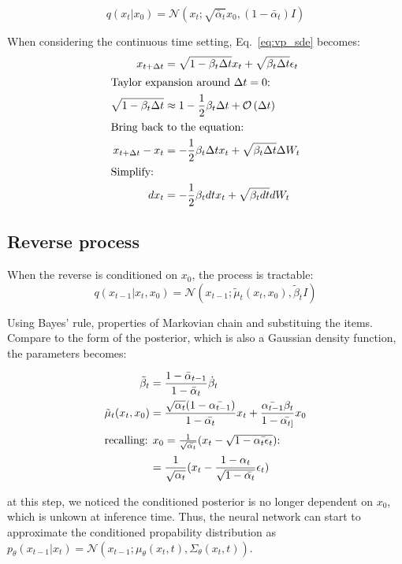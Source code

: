 \begin{equation}
    q(x_t | x_0) = \mathcal{N}(x_{t}; \sqrt{\bar{\alpha}_t} x_0, (1 - \bar{\alpha}_t) I)
\end{equation}

When considering the continuous time setting, Eq.~\ref{eq:vp_sde} becomes:
\begin{align}
        x_{t + \Delta t} &= \sqrt{1 - \beta_t \Delta t} x_t + \sqrt{\beta_t \Delta t} \epsilon_t \\
        \intertext{Taylor expansion around $\Delta t = 0$:}
        \sqrt{1 - \beta_t \Delta t} &\approx 1 - \frac{1}{2}\beta_t \Delta t + \mathcal{O}\left(\Delta t\right) \\
        \intertext{Bring back to the equation:}
        x_{t + \Delta t} - x_t &= - \frac{1}{2}\beta_t \Delta t x_t + \sqrt{\beta_t \Delta t} \Delta W_t \\
        \intertext{Simplify:}
        dx_{t} &= - \frac{1}{2}\beta_t dt x_t + \sqrt{\beta_t dt} dW_t
    \label{eq: vp-sde-continuous}
\end{align}

\subsection{Reverse process}

When the reverse is conditioned on $x_{0}$, the process is tractable:
\begin{equation}
    q(x_{t-1}| x_{t}, x_{0}) = \mathcal{N}(x_{t-1}; \tilde{\mu}_{t}(x_{t}, x_{0}), \tilde{\beta}_{t}I)
\end{equation}

Using Bayes' rule, properties of Markovian chain and substituing the items. Compare to the form of the posterior, which is also a Gaussian density function, the parameters becomes:

\begin{align}
	\tilde{\beta}_{t} &= \frac{1 - \bar{\alpha}_{t-1}}{1 - \bar{\alpha}_{t}}\dot \beta_{t} \\
	\tilde{\mu}_{t}(x_{t}, x_{0}) &= \frac{\sqrt{\alpha_{t}} (1-\bar{\alpha_{t-1}})}{1 - \bar{\alpha_{t}}}x_{t}  +
	\frac{\bar{\alpha_{t-1}}\beta_{t}}{1 - \bar{\alpha_{t]}}}x_{0}\\
	\intertext{recalling: $x_{0} = \frac{1}{\sqrt{\bar{\alpha_{t}}}}(x_{t} - \sqrt{1- \bar{\alpha_{t}\epsilon_{t}}})$:}
	                              &= \frac{1}{\sqrt{\alpha_{t}}}(x_{t} - \frac{1-\alpha_{t}}{\sqrt{1 - \bar{\alpha_{t}}}} \epsilon_{t})\\
\end{align}

at this step, we noticed the conditioned posterior is no longer dependent on $x_{0}$, which is unkown at inference time. Thus, the neural network can start to approximate the conditioned propability distribution as $p_{\theta}(x_{t-1} | x_{t}) = \mathcal{N}(x_{t-1}; \mu_{\theta}(x_{t}, t), \Sigma_{\theta}(x_{t}, t))$.

